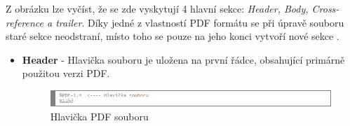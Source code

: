Z obrázku lze vyčíst, že se zde vyskytují 4 hlavní sekce: \textit{Header, Body, Cross-reference a trailer}. Díky jedné z vlastností PDF formátu se při úpravě souboru staré sekce neodstraní, místo toho se pouze na jeho konci vytvoří nové sekce \cite{PDFInfoSec}.
\begin{itemize}
	\item \textbf{Header} - Hlavička souboru je uložena na první řádce, obsahující primárně použitou verzi PDF.
	\begin{figure}[h!]
	\centering
	\includegraphics[width=12cm]{img/pdf_hlavicka}
	\caption{Hlavička PDF souboru}
	\label{fig:pdf_header}
	\end{figure}
	

\end{itemize}
